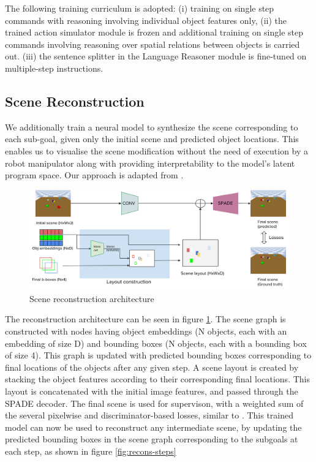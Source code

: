 The following training curriculum is adopted: (i) training on single step commands with reasoning involving individual object features only, 
(ii) the trained action simulator module is frozen and additional training on single step commands involving reasoning over spatial relations between objects is carried out. 
(iii) the sentence splitter in the Language Reasoner module is fine-tuned on multiple-step instructions. 

\subsection{Scene Reconstruction}
We additionally train a neural model to synthesize the scene corresponding to each sub-goal, given only the initial scene and predicted object locations. This enables us to visualise the scene modification without the need of execution by a robot manipulator along with providing interpretability to the model's latent program space. Our approach is adapted from \cite{dhamo2020_SIMSG}.

\begin{figure}
    \centering
    \includegraphics[width=\textwidth]{assets/recons-arch.png}
    \caption{Scene reconstruction architecture}
    \label{fig:recons}
\end{figure}

The reconstruction architecture can be seen in figure \ref{fig:recons}. The scene graph is constructed with nodes having object embeddings (N objects, each with an embedding of size D) and bounding boxes (N objects, each with a bounding box of size 4). This graph is updated with predicted bounding boxes corresponding to final locations of the objects after any given step. A scene layout is created by stacking the object features according to their corresponding final locations. This layout is concatenated with the initial image features, and passed through the SPADE decoder. The final scene is used for supervison, with a weighted sum of the several pixelwise and discriminator-based losses, similar to \cite{dhamo2020_SIMSG}. This trained model can now be used to reconstruct any intermediate scene, by updating the predicted bounding boxes in the scene graph corresponding to the subgoals at each step, as shown in figure \ref{fig:recons-steps}

